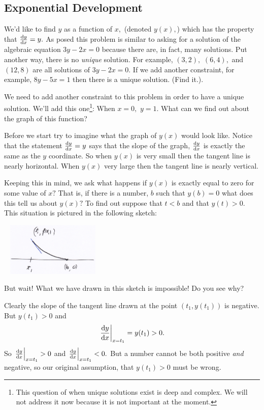 \endaptta{}

\subsection{Exponential Development}
We'd like to find $y$ as a function of $x,$ (denoted $y(x),$) which
has the property that 
$\frac{\text{d}{y}}{\text{d}{x}} =y.$ As posed this problem is similar to asking for a
solution of the algebraic equation $3y-2x=0$ because there are, in
fact, many solutions. Put another way, there is no
  \emph{unique} solution.  For example, $(3,2),$ $(6,4),$ and $(12,8)$
  are all solutions of $3y-2x=0$. If we add another constraint, for
  example,
  $8y-5x=1$ then there is a unique solution. (Find it.).

We need to add another constraint to this problem in
order to have a unique solution. We'll add this one\footnote{This
  question of when unique solutions exist is deep and complex. We will not
  address it now because it is not important at the moment.}: When $x=0,$
$y=1.$ What can we find out about the graph of this function?

Before we start try to imagine what the graph of $y(x)$ would look
like. Notice that the statement $\frac{\text{d}{y}}{\text{d}{x}} =y$ says that the slope
of the graph, $\frac{\text{d}{y}}{\text{d}{x}}$ is exactly the same as the $y$
coordinate. So when $y(x)$ is very small then the tangent line is
nearly horizontal. When $y(x)$ very large then the tangent line is
nearly vertical. 

Keeping this in mind, we ask what happens if $y(x)$ is exactly equal
to zero for some value of $x?$ That is, if there is a number, $b$ such
that $y(b) = 0$ what does this tell us about $y(x)?$ To find out
suppose that $t<b$ and that $y(t) >0.$ This situation is
pictured in the following sketch:\\
\centerline{\includegraphics*[height=1in,width=2in]{Figures/ExpFunc1}}

But wait! What we have drawn in this sketch is impossible! Do you see why?

Clearly the slope of the tangent line drawn at the point
$(t_1,y(t_1))$ is negative. But $y(t_1)>0$ and 
$$
\left.\frac{\text{d}{y}}{\text{d}{x}}\right|_{x=t_1} = y(t_1) > 0.
$$
So $\left.\frac{\text{d}{y}}{\text{d}{x}}\right|_{x=t_1} >0$ and
$\left.\frac{\text{d}{y}}{\text{d}{x}}\right|_{x=t_1} <0.$ But a number cannot be both
positive \emph{and} negative, so our original assumption, that
$y(t_1)>0$ must be wrong.


